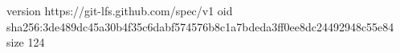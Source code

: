 version https://git-lfs.github.com/spec/v1
oid sha256:3de489dc45a30b4f35c6dabf574576b8c1a7bdeda3ff0ee8dc24492948c55e84
size 124
